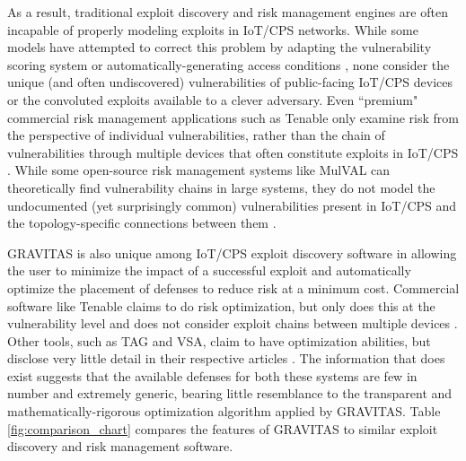 \documentclass[10pt,journal,compsoc]{IEEEtran}
\begin{document}
\par As a result, traditional exploit discovery and risk management engines are often incapable of properly modeling exploits in IoT/CPS networks. While some models have attempted to correct this problem by adapting the vulnerability scoring system or automatically-generating access conditions \cite{ur-rehman2019, ghazo2019}, none consider the unique (and often undiscovered) vulnerabilities of public-facing IoT/CPS devices or the convoluted exploits available to a clever adversary. Even ``premium" commercial risk management applications such as Tenable only examine risk from the perspective of individual vulnerabilities, rather than the chain of vulnerabilities through multiple devices that often constitute exploits in IoT/CPS \cite{tenable2021}. While some open-source risk management systems like MulVAL can theoretically find vulnerability chains in large systems, they do not model the undocumented (yet surprisingly common) vulnerabilities present in IoT/CPS and the topology-specific connections between them \cite{ou2005}.

\par GRAVITAS is also unique among IoT/CPS exploit discovery software in allowing the user to minimize the impact of a successful exploit and automatically optimize the placement of defenses to reduce risk at a minimum cost. Commercial software like Tenable claims to do risk optimization, but only does this at the vulnerability level and does not consider exploit chains between multiple devices \cite{tenable2021}. Other tools, such as TAG and VSA, claim to have optimization abilities, but disclose very little detail in their respective articles \cite{malowidzki2019, ur-rehman2019}. The information that does exist suggests that the available defenses for both these systems are few in number and extremely generic, bearing little resemblance to the transparent and mathematically-rigorous optimization algorithm applied by GRAVITAS. Table \ref{fig:comparison_chart} compares the features of GRAVITAS to similar exploit discovery and risk management software.
\end{document}
